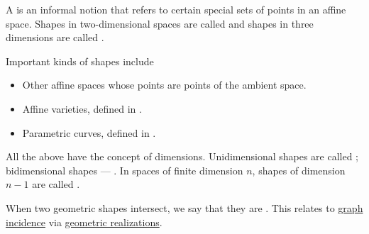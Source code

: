 \begin{concept}\label{con:geometric_shape}
  A  is an informal notion that refers to certain special sets of points in an affine space. Shapes in two-dimensional spaces are called  and shapes in three dimensions are called .

  Important kinds of shapes include
  \begin{itemize}
    \item Other affine spaces whose points are points of the ambient space.
    \item Affine varieties, defined in .
    \item Parametric curves, defined in .
  \end{itemize}

  All the above have the concept of dimensions. Unidimensional shapes are called ; bidimensional shapes --- . In spaces of finite dimension \( n \), shapes of dimension \( n - 1 \) are called .

  When two geometric shapes intersect, we say that they are . This relates to \hyperref[def:graph_incidence]{graph incidence} via \hyperref[def:graph_geometric_realization]{geometric realizations}.
\end{concept}

